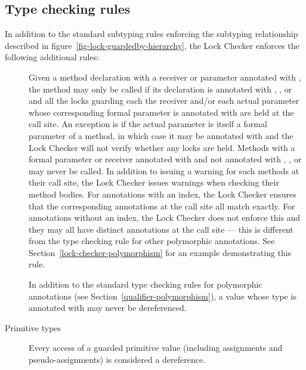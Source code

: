 \subsection{Type checking rules}

In addition to the standard subtyping rules enforcing the subtyping relationship
described in figure~\ref{fig-lock-guardedby-hierarchy}, the Lock Checker enforces
the following additional rules:

\begin{description}

\item[]
  Given a method declaration with a receiver or parameter annotated with
  , the method may only be called if its declaration is
  annotated with , , 
  or  and
  all the locks guarding each the receiver and/or each actual parameter whose
  corresponding formal parameter is annotated with 
  are held at the call site.  An exception is if the actual parameter is itself
  a formal parameter of a method, in which case it may be annotated with 
  and the Lock Checker will not verify whether any locks are held.
  Methods with a formal parameter or receiver annotated with 
  and not annotated with , , 
  or  may never be called. In addition to issuing a warning for such methods
  at their call site, the Lock Checker issues warnings when checking their method bodies.
  For  annotations with an index, the Lock Checker ensures that the
  corresponding  annotations at the call site all match exactly.
  For  annotations without an index, the Lock Checker does not enforce
  this and they may all have distinct  annotations at the call site ---
  this is different from the type checking rule for other polymorphic annotations.
  See Section~\ref{lock-checker-polymorphism} for an example demonstrating this rule.

\item[]
  In addition to the standard type checking rules for polymorphic annotations
  (see Section~\ref{qualifier-polymorphism}), a value whose type is annotated with
   may never be dereferenced.

\item[Primitive types]
  Every access of a guarded primitive value (including assignments
  and pseudo-assignments) is considered a dereference.


\end{description}

